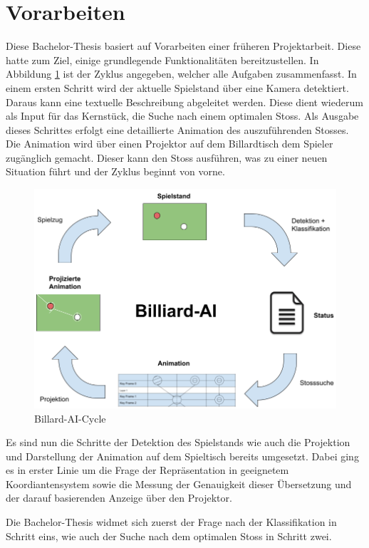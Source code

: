 \section{Vorarbeiten}\label{kap:vorarbeiten}
Diese Bachelor-Thesis basiert auf Vorarbeiten einer früheren Projektarbeit. Diese hatte zum Ziel, einige
grundlegende Funktionalitäten bereitzustellen. In Abbildung \ref{fig:billiard_ai_cycle} ist der Zyklus angegeben,
welcher alle Aufgaben zusammenfasst. In einem ersten Schritt wird der aktuelle Spielstand über eine Kamera detektiert.
Daraus kann eine textuelle Beschreibung abgeleitet werden. Diese dient wiederum als Input für das Kernstück, die Suche
nach einem optimalen Stoss. Als Ausgabe dieses Schrittes erfolgt eine detaillierte Animation des auszuführenden Stosses.
Die Animation wird über einen Projektor auf dem Billardtisch dem Spieler zugänglich gemacht. Dieser kann den Stoss ausführen,
was zu einer neuen Situation führt und der Zyklus beginnt von vorne.

\begin{figure}[h!]
    \begin{center}
        \includegraphics[width=0.8\linewidth]{../common/03_billiard_ai/resources/19_billiard_ai_cycle.png}
    \end{center}
    \caption{Billard-AI-Cycle}
    \label{fig:billiard_ai_cycle}
\end{figure}

Es sind nun die Schritte der Detektion des Spielstands wie auch die Projektion und Darstellung der Animation auf dem
Spieltisch bereits umgesetzt. Dabei ging es in erster Linie um die Frage der Repräsentation in geeignetem Koordiantensystem
sowie die Messung der Genauigkeit dieser Übersetzung und der darauf basierenden Anzeige über den Projektor.

Die Bachelor-Thesis widmet sich zuerst der Frage nach der Klassifikation in Schritt eins, wie auch der Suche
nach dem optimalen Stoss in Schritt zwei.